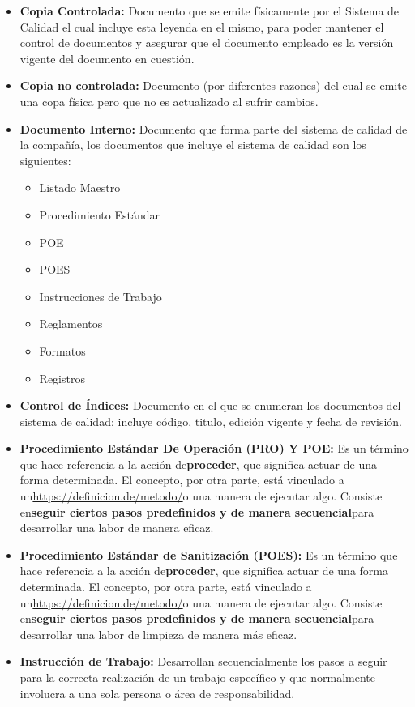 \begin{itemize}
	\item \textbf{Copia Controlada:} Documento que se emite físicamente por el Sistema de Calidad el cual incluye esta leyenda en el mismo, para poder mantener el control de documentos y asegurar que el documento empleado es la versión vigente del documento en cuestión.
	\item \textbf{Copia no controlada:} Documento (por diferentes razones) del cual se emite una copa física pero que no es actualizado al sufrir cambios.
	\item \textbf{Documento Interno:} Documento que forma parte del sistema de calidad de la compañía, los documentos que incluye el sistema de calidad son los siguientes:
	\begin{itemize}
		\item Listado Maestro
		\item Procedimiento Estándar
		\item POE
		\item POES
		\item Instrucciones de Trabajo
		\item Reglamentos
		\item Formatos
		\item Registros
	\end{itemize}
	\item \textbf{Control de Índices:} Documento en el que se enumeran los documentos del sistema de calidad; incluye código, titulo, edición vigente y fecha de revisión.
	\item \textbf{Procedimiento Estándar De Operación (PRO) Y POE:} Es un término que hace referencia a la acción de\textbf{proceder}, que significa actuar de una forma determinada. El concepto, por otra parte, está vinculado a un\url{https://definicion.de/metodo/}o una manera de ejecutar algo. Consiste en\textbf{seguir ciertos pasos predefinidos y de manera secuencial}para desarrollar una labor de manera eficaz.
	\item \textbf{Procedimiento Estándar de Sanitización (POES):} Es un término que hace referencia a la acción de\textbf{proceder}, que significa actuar de una forma determinada. El concepto, por otra parte, está vinculado a un\url{https://definicion.de/metodo/}o una manera de ejecutar algo. Consiste en\textbf{seguir ciertos pasos predefinidos y de manera secuencial}para desarrollar una labor de limpieza de manera más eficaz.
	\item \textbf{Instrucción de Trabajo:} Desarrollan secuencialmente los pasos a seguir para la correcta realización de un trabajo específico y que normalmente involucra a una sola persona o área de responsabilidad.

\end{itemize}
